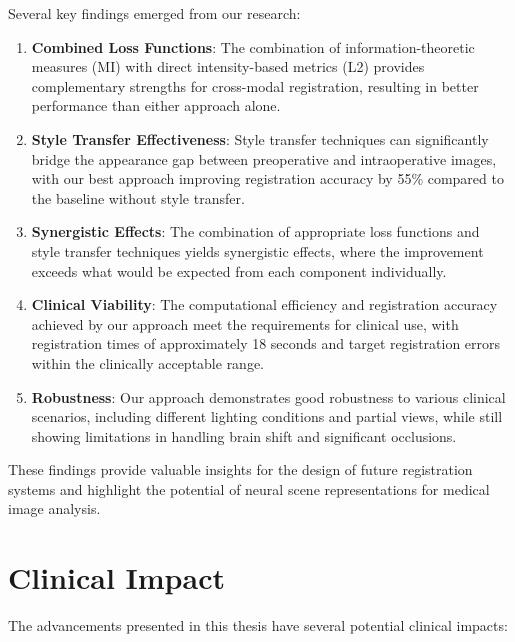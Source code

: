 Several key findings emerged from our research:

\begin{enumerate}
    \item \textbf{Combined Loss Functions}: The combination of information-theoretic measures (MI) with direct intensity-based metrics (L2) provides complementary strengths for cross-modal registration, resulting in better performance than either approach alone.
    
    \item \textbf{Style Transfer Effectiveness}: Style transfer techniques can significantly bridge the appearance gap between preoperative and intraoperative images, with our best approach improving registration accuracy by 55\% compared to the baseline without style transfer.
    
    \item \textbf{Synergistic Effects}: The combination of appropriate loss functions and style transfer techniques yields synergistic effects, where the improvement exceeds what would be expected from each component individually.
    
    \item \textbf{Clinical Viability}: The computational efficiency and registration accuracy achieved by our approach meet the requirements for clinical use, with registration times of approximately 18 seconds and target registration errors within the clinically acceptable range.
    
    \item \textbf{Robustness}: Our approach demonstrates good robustness to various clinical scenarios, including different lighting conditions and partial views, while still showing limitations in handling brain shift and significant occlusions.
\end{enumerate}

These findings provide valuable insights for the design of future registration systems and highlight the potential of neural scene representations for medical image analysis.

\section{Clinical Impact}

The advancements presented in this thesis have several potential clinical impacts:

